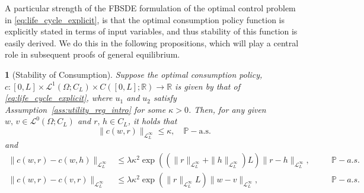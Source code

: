 \documentclass[11pt,oneside,english,reqno,dvipsnames,table]{amsart}
\numberwithin{equation}{section}
\theoremstyle{plain}
\theoremstyle{definition}
\theoremstyle{remark}
\theoremstyle{plain}
\theoremstyle{plain}
\newtheorem{prop}[thm]{\protect\propositionname}
\theoremstyle{plain}
\theoremstyle{plain}
\theoremstyle{plain}
\theoremstyle{plain}
\theoremstyle{plain}
\providecommand{\propositionname}{Proposition}
\newcommand{\scL}{\mathscr{L}}
\newcommand{\PP}{\mathbb{P}}
\newcommand{\RR}{\mathbb{R}}
\newcommand{\mbP}{\mathbb{P}}
\newcommand{\msL}{\mathscr{L}}
\numberwithin{thm}{section}
\begin{document}
A particular strength of the FBSDE formulation of the optimal control problem in \eqref{eq:life_cycle_explicit}, is that the optimal consumption policy function is explicitly stated in terms of input variables, and thus stability of this function is easily derived. We do this in the following propositions, which will play a central role in subsequent proofs of general equilibrium. 


\begin{prop}[Stability of Consumption]\label{prop:life_cycle_consumption_stabillity}
%
    Suppose the optimal consumption policy, $c:[0,L]\times \scL^1(\Omega;C_L)\times C([0,L];\RR)\rightarrow \RR$ is given by that of \eqref{eq:life_cycle_explicit}, where $u_1$ and $u_2$ satisfy Assumption~\ref{ass:utility_reg_intro} for some $\kappa>0$. 
   Then, for any given $w,\, v \in \scL^0(\Omega;C_L)$ and $r,\,h\in C_L$, it holds that
\begin{equation}\label{eq:life_cycle_consump_bdd}
    \|c(w,r)\|_{\msL^\infty_L}\leq \kappa, \quad \mbP-\text{a.s.}
    \end{equation}
   and
    \begin{align}
    \|c(w,r)-c(w,h)\|_{\msL^\infty_L} &\leq \lambda  \kappa^2 \exp\left((\|r\|_{\msL^\infty_L}+\|h\|_{\msL^\infty_L})L\right) \| r-h \|_{\msL^\infty_L},\label{eq:consump_interest_stable}\quad &&\PP-a.s.
    \\
   \|c(w,r)-c(v,r)\|_{\msL^\infty_L} &\leq \lambda \kappa^2 \exp\left(\|r\|_{\msL^\infty_L} L\right) \|w-v\|_{\msL^\infty_L}, \quad &&\PP-a.s. \label{eq:consump_wealth_stable} %
    \end{align}
\end{prop}
%
%
\end{document}
